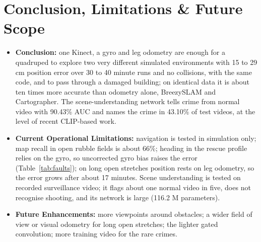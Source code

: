 \documentclass[11pt, a4paper]{article}
\begin{document}
\section{Conclusion, Limitations \& Future Scope}
\begin{itemize}[noitemsep, topsep=2pt]
    \item \textbf{Conclusion:} one Kinect, a gyro and leg odometry are enough for a quadruped to explore two very different simulated environments with 15 to 29 cm position error over 30 to 40 minute runs and no collisions, with the same code, and to pass through a damaged building; on identical data it is about ten times more accurate than odometry alone, BreezySLAM and Cartographer. The scene-understanding network tells crime from normal video with 90.43\% AUC and names the crime in 43.10\% of test videos, at the level of recent CLIP-based work.
    \item \textbf{Current Operational Limitations:} navigation is tested in simulation only; map recall in open rubble fields is about 66\%; heading in the rescue profile relies on the gyro, so uncorrected gyro bias raises the error (Table~\ref{tab:faults}); on long open stretches position rests on leg odometry, so the error grows after about 17 minutes. Scene understanding is tested on recorded surveillance video; it flags about one normal video in five, does not recognise shooting, and its network is large (116.2 M parameters).
    \item \textbf{Future Enhancements:} more viewpoints around obstacles; a wider field of view or visual odometry for long open stretches; the lighter gated convolution; more training video for the rare crimes.
\end{itemize}
\end{document}
